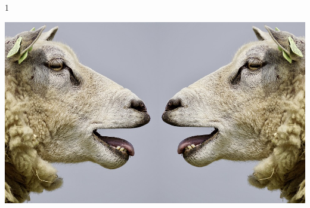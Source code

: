 \documentclass[../../../main.tex]{subfiles}
\begin{document}
1

\includegraphics{./example-image}

\mycmd
\end{document}
